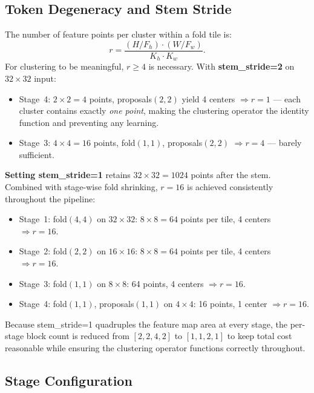 \documentclass[conference]{IEEEtran}
\begin{document}
\subsection{Token Degeneracy and Stem Stride}
\label{sec:degeneracy}

The number of feature points per cluster within a fold tile is:
\begin{equation}
  r=\frac{(H/F_h)\cdot(W/F_w)}{K_h\cdot K_w}.
  \label{eq:ratio}
\end{equation}
For clustering to be meaningful, $r\geq4$ is necessary. With
\textbf{stem\_stride=2} on $32\!\times\!32$ input:
\begin{itemize}
  \item Stage~4: $2\!\times\!2=4$ points, proposals$(2,2)$ yield 4
        centers $\Rightarrow r=1$ --- each cluster contains exactly
        \emph{one point}, making the clustering operator the identity
        function and preventing any learning.
  \item Stage~3: $4\!\times\!4=16$ points, fold$(1,1)$,
        proposals$(2,2)$ $\Rightarrow r=4$ --- barely sufficient.
\end{itemize}

\textbf{Setting stem\_stride=1} retains $32\!\times\!32=1024$ points
after the stem. Combined with stage-wise fold shrinking, $r=16$ is
achieved consistently throughout the pipeline:
\begin{itemize}
  \item Stage~1: fold$(4,4)$ on $32\!\times\!32$: $8\!\times\!8=64$
        points per tile, 4 centers $\Rightarrow r=16$.
  \item Stage~2: fold$(2,2)$ on $16\!\times\!16$: $8\!\times\!8=64$
        points per tile, 4 centers $\Rightarrow r=16$.
  \item Stage~3: fold$(1,1)$ on $8\!\times\!8$: 64 points, 4 centers
        $\Rightarrow r=16$.
  \item Stage~4: fold$(1,1)$, proposals$(1,1)$ on $4\!\times\!4$:
        16 points, 1 center $\Rightarrow r=16$.
\end{itemize}

Because stem\_stride=1 quadruples the feature map area at every stage,
the per-stage block count is reduced from $[2,2,4,2]$ to $[1,1,2,1]$
to keep total cost reasonable while ensuring the clustering operator
functions correctly throughout.

\subsection{Stage Configuration}
\end{document}
